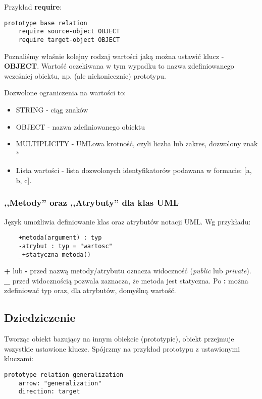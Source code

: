 Przykład \textbf{require}:
\begin{lstlisting}
prototype base relation
    require source-object OBJECT
    require target-object OBJECT
\end{lstlisting}

Poznaliśmy właśnie kolejny rodzaj wartości jaką można ustawić klucz - \textbf{OBJECT}. Wartość oczekiwana w tym wypadku to nazwa zdefiniowanego wcześniej obiektu, np. (ale niekoniecznie) prototypu.

Dozwolone ograniczenia na wartości to:
\begin{itemize}
	\item STRING - ciąg znaków
	\item OBJECT - nazwa zdefiniowanego obiektu
	\item MULTIPLICITY - UMLowa krotność, czyli liczba lub zakres, dozwolony znak *
	\item Lista wartości - lista dozwolonych identyfikatorów podawana w formacie: [a, b, c].
\end{itemize}

\subsubsection{,,Metody'' oraz ,,Atrybuty'' dla klas UML}

Język \omlet umożliwia definiowanie klas oraz atrybutów notacji UML. Wg przykładu:
\begin{lstlisting}
	+metoda(argument) : typ
    -atrybut : typ = "wartosc"
    _+statyczna_metoda()
\end{lstlisting}

\textbf{+} lub \textbf{-} przed nazwą metody/atrybutu oznacza widoczność (\emph{public} lub \emph{private}). \textbf{\_} przed widocznością pozwala zaznacza, że metoda jest statyczna. Po \textbf{:} można zdefiniować typ oraz, dla atrybutów, domyślną wartość.

\subsection{Dziedziczenie}

Tworząc obiekt bazujący na innym obiekcie (prototypie), obiekt przejmuje wszystkie ustawione klucze. Spójrzmy na przykład prototypu z ustawionymi kluczami:

\begin{lstlisting}
prototype relation generalization
    arrow: "generalization"
    direction: target
\end{lstlisting}

